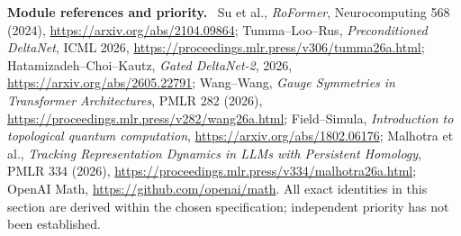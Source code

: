 \documentclass[11pt,a4paper,oneside]{book}
\newcommand{\note}[1]{\par\medskip\noindent\textbf{#1}\ }
\begin{document}
\note{Module references and priority.} Su et al., \emph{RoFormer}, Neurocomputing 568 (2024), \url{https://arxiv.org/abs/2104.09864}; Tumma--Loo--Rus, \emph{Preconditioned DeltaNet}, ICML 2026, \url{https://proceedings.mlr.press/v306/tumma26a.html}; Hatamizadeh--Choi--Kautz, \emph{Gated DeltaNet-2}, 2026, \url{https://arxiv.org/abs/2605.22791}; Wang--Wang, \emph{Gauge Symmetries in Transformer Architectures}, PMLR 282 (2026), \url{https://proceedings.mlr.press/v282/wang26a.html}; Field--Simula, \emph{Introduction to topological quantum computation}, \url{https://arxiv.org/abs/1802.06176}; Malhotra et al., \emph{Tracking Representation Dynamics in LLMs with Persistent Homology}, PMLR 334 (2026), \url{https://proceedings.mlr.press/v334/malhotra26a.html}; OpenAI Math, \url{https://github.com/openai/math}. All exact identities in this section are derived within the chosen specification; independent priority has not been established.
\end{document}
